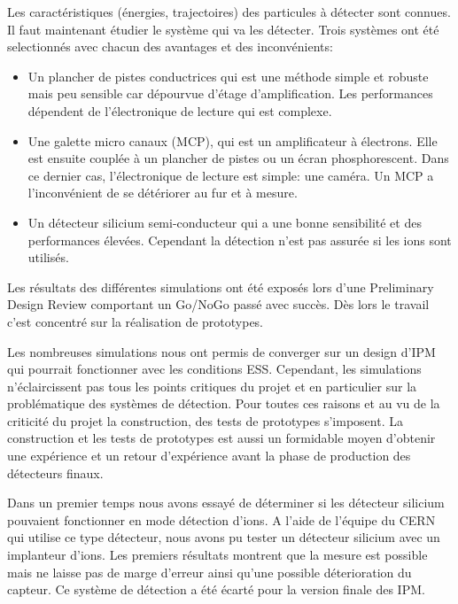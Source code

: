 Les caractéristiques (énergies, trajectoires) des particules à détecter sont connues. Il faut maintenant étudier le système qui va les détecter. Trois systèmes ont été selectionnés avec chacun des avantages et des inconvénients:
\begin{itemize}
  \item Un plancher de pistes conductrices qui est une méthode simple et robuste mais peu sensible car dépourvue d'étage d'amplification. Les performances dépendent de l'électronique de lecture qui est complexe.
  \item Une galette micro canaux  (MCP), qui est un amplificateur à électrons. Elle est ensuite couplée à un plancher de pistes ou un écran phosphorescent. Dans ce dernier cas, l'électronique de lecture est simple: une caméra. Un MCP a l'inconvénient de se détériorer au fur et à mesure.
  \item Un détecteur silicium semi-conducteur qui a une bonne sensibilité et des performances élevées. Cependant la détection n'est pas assurée si les ions sont utilisés.
\end{itemize}
Les résultats des différentes simulations ont été exposés lors d'une Preliminary Design Review comportant un Go/NoGo passé avec succès. Dès lors le travail c'est concentré sur la réalisation de prototypes.

Les nombreuses simulations nous ont permis de converger sur un design d’IPM qui pourrait fonctionner avec les conditions ESS. Cependant, les simulations n'éclaircissent pas tous les points critiques du projet et en particulier sur la problématique des systèmes de détection. Pour toutes ces raisons et au vu de la criticité du projet la construction, des tests de prototypes s’imposent. La construction et les tests de prototypes est aussi un formidable moyen d'obtenir une expérience et un retour d'expérience avant la phase de production des détecteurs finaux.


Dans un premier temps nous avons essayé de déterminer si les détecteur silicium pouvaient fonctionner en mode détection d’ions. A l’aide de l’équipe du CERN qui utilise ce type détecteur, nous avons pu tester un détecteur silicium avec un implanteur d’ions. Les premiers résultats montrent que la mesure est possible mais ne laisse pas de marge d'erreur ainsi qu'une possible déterioration du capteur. Ce système de détection a été écarté pour la version finale des IPM.

